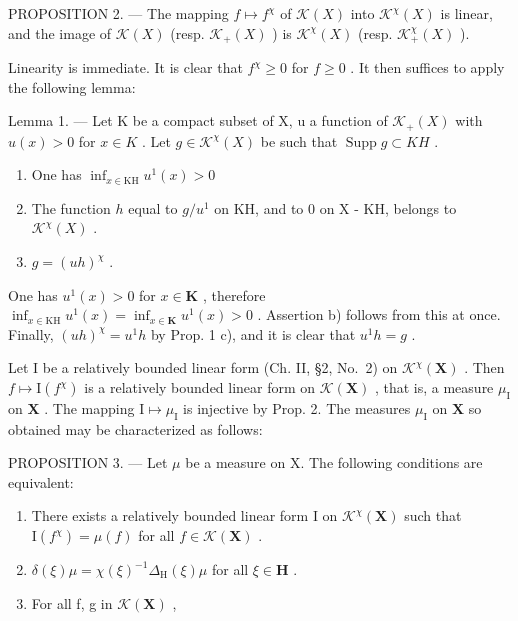 PROPOSITION 2. --- The mapping \(f \mapsto f^{\chi}\) of \(\mathcal{K}(X)\) into \(\mathcal{K}^{\chi}(X)\) is linear, and the image of \(\mathcal{K}(X)\) (resp. \(\mathcal{K}_{+}(X)\) ) is \(\mathcal{K}^{\chi}(X)\) (resp. \(\mathcal{K}_{+}^{\chi}(X)\) ).

Linearity is immediate. It is clear that \(f^{\chi} \geqslant 0\) for \(f \geqslant 0\) . It then suffices to apply the following lemma:

Lemma 1. --- Let K be a compact subset of X, u a function of \(\mathcal{K}_{+}(X)\) with \(u(x) > 0\) for \(x \in K\) . Let \(g \in \mathcal{K}^{\chi}(X)\) be such that \(\operatorname{Supp} g \subset KH\) .

\begin{enumerate}
\def\labelenumi{\alph{enumi})}
\item
  One has \(\inf_{x\in \mathrm{KH}}u^1 (x) > 0\)
\item
  The function \(h\) equal to \(g / u^1\) on KH, and to 0 on X - KH, belongs to \(\mathcal{K}^{\chi}(X)\) .
\item
  \(g = (uh)^{\chi}\) .
\end{enumerate}

One has \(u^1(x) > 0\) for \(x \in \mathbf{K}\) , therefore \(\inf_{x \in \mathrm{KH}} u^1(x) = \inf_{x \in \mathbf{K}} u^1(x) > 0\) . Assertion b) follows from this at once. Finally, \((uh)^{\chi} = u^{1}h\) by Prop. 1 c), and it is clear that \(u^1h = g\) .

Let I be a relatively bounded linear form (Ch. II, §2, No.~2) on \(\mathcal{K}^{\chi}(\mathbf{X})\) . Then \(f \mapsto \mathrm{I}(f^{\chi})\) is a relatively bounded linear form on \(\mathcal{K}(\mathbf{X})\) , that is, a measure \(\mu_{\mathrm{I}}\) on \(\mathbf{X}\) . The mapping \(\mathrm{I} \mapsto \mu_{\mathrm{I}}\) is injective by Prop. 2. The measures \(\mu_{\mathrm{I}}\) on \(\mathbf{X}\) so obtained may be characterized as follows:

PROPOSITION 3. --- Let \(\mu\) be a measure on X. The following conditions are equivalent:

\begin{enumerate}
\def\labelenumi{\alph{enumi})}
\item
  There exists a relatively bounded linear form I on \(\mathcal{K}^{\chi}(\mathbf{X})\) such that \(\mathrm{I}(f^{\chi}) = \mu(f)\) for all \(f\in \mathcal{K}(\mathbf{X})\) .
\item
  \(\delta (\xi)\mu = \chi (\xi)^{-1}\Delta_{\mathrm{H}}(\xi)\mu\) for all \(\xi \in \mathbf{H}\) .
\item
  For all f, g in \(\mathcal{K}(\mathbf{X})\) ,
\end{enumerate}


